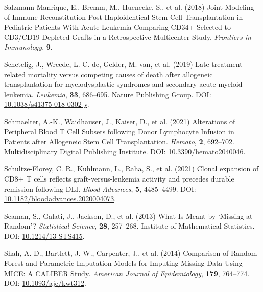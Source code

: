 \documentclass[
  letterpaper,
  paper=240mm:170mm,
  twoside=true,
  open=right,
  fontsize=10pt,
  pagesize=false,
  BCOR=15mm,
  DIV=14,
  headinclude=true,
  footinclude=false,
  headsepline=on]{scrbook}
\newlength{\cslhangindent}
\newenvironment{CSLReferences}[2] %
 {\begin{list}{}{%
  \setlength{\itemindent}{0pt}
  \setlength{\leftmargin}{0pt}
  \setlength{\parsep}{0pt}
  \ifodd #1
   \setlength{\leftmargin}{\cslhangindent}
   \setlength{\itemindent}{-1\cslhangindent}
  \fi
  \setlength{\itemsep}{#2\baselineskip}}}
 {\end{list}}
\begin{document}
\begin{CSLReferences}{1}{1}
Salzmann-Manrique, E., Bremm, M., Huenecke, S., et al. (2018) Joint
{Modeling} of {Immune Reconstitution Post Haploidentical Stem Cell
Transplantation} in {Pediatric Patients With Acute Leukemia Comparing
CD34}+-{Selected} to {CD3}/{CD19-Depleted Grafts} in a {Retrospective
Multicenter Study}. \emph{Frontiers in Immunology}, \textbf{9}.

Schetelig, J., Wreede, L. C. de, Gelder, M. van, et al. (2019) Late
treatment-related mortality versus competing causes of death after
allogeneic transplantation for myelodysplastic syndromes and secondary
acute myeloid leukemia. \emph{Leukemia}, \textbf{33}, 686--695. Nature
Publishing Group. DOI:
\href{https://doi.org/10.1038/s41375-018-0302-y}{10.1038/s41375-018-0302-y}.

Schmaelter, A.-K., Waidhauser, J., Kaiser, D., et al. (2021) Alterations
of {Peripheral Blood T Cell Subsets} following {Donor Lymphocyte
Infusion} in {Patients} after {Allogeneic Stem Cell Transplantation}.
\emph{Hemato}, \textbf{2}, 692--702. Multidisciplinary Digital
Publishing Institute. DOI:
\href{https://doi.org/10.3390/hemato2040046}{10.3390/hemato2040046}.

Schultze-Florey, C. R., Kuhlmann, L., Raha, S., et al. (2021) Clonal
expansion of {CD8}+ {T} cells reflects graft-versus-leukemia activity
and precedes durable remission following {DLI}. \emph{Blood Advances},
\textbf{5}, 4485--4499. DOI:
\href{https://doi.org/10.1182/bloodadvances.2020004073}{10.1182/bloodadvances.2020004073}.

Seaman, S., Galati, J., Jackson, D., et al. (2013) What {Is Meant} by
{`{Missing} at {Random}'}? \emph{Statistical Science}, \textbf{28},
257--268. Institute of Mathematical Statistics. DOI:
\href{https://doi.org/10.1214/13-STS415}{10.1214/13-STS415}.

Shah, A. D., Bartlett, J. W., Carpenter, J., et al. (2014) Comparison of
{Random Forest} and {Parametric Imputation Models} for {Imputing Missing
Data Using MICE}: {A CALIBER Study}. \emph{American Journal of
Epidemiology}, \textbf{179}, 764--774. DOI:
\href{https://doi.org/10.1093/aje/kwt312}{10.1093/aje/kwt312}.


\end{CSLReferences}
\end{document}
